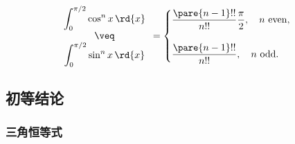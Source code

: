 \documentclass[hidelinks]{ctexart}
\begin{document}
\begin{finale}
    \[ \begin{array}{c}
        \displaystyle \int_{0}^{\pi/2} \cos^n x\,\rd{x}\\
        \veq \\
        \displaystyle \int_{0}^{\pi/2} \sin^n x\,\rd{x}
    \end{array} = \begin{cases}
        \displaystyle \frac{\pare{n-1}!!}{n!!}\frac{\pi}{2},\quad n\ \mathrm{even},\\
        \\
        \displaystyle \frac{\pare{n-1}!!}{n!!},\quad n\ \mathrm{odd}.
    \end{cases} \]
\end{finale}



\subsection{初等结论} %
\label{sub:初等结论}

\subsubsection{三角恒等式} %
\label{ssub:三角恒等式}
\end{document}
